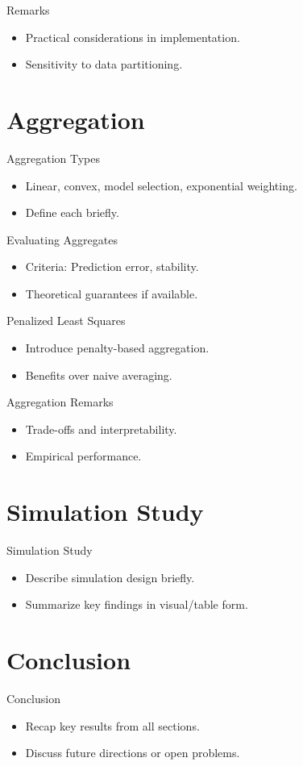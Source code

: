 \documentclass{beamer}
\newcommand{\0}{\emptyset}
\newcommand{\1}{\mathmybb{1}}
\begin{document}
\begin{frame}{Remarks}
  \begin{itemize}
    \item Practical considerations in implementation.
    \item Sensitivity to data partitioning.
  \end{itemize}
\end{frame}

\section{Aggregation}
\begin{frame}{Aggregation Types}
  \begin{itemize}
    \item Linear, convex, model selection, exponential weighting.
    \item Define each briefly.
  \end{itemize}
\end{frame}

\begin{frame}{Evaluating Aggregates}
  \begin{itemize}
    \item Criteria: Prediction error, stability.
    \item Theoretical guarantees if available.
  \end{itemize}
\end{frame}

\begin{frame}{Penalized Least Squares}
  \begin{itemize}
    \item Introduce penalty-based aggregation.
    \item Benefits over naive averaging.
  \end{itemize}
\end{frame}

\begin{frame}{Aggregation Remarks}
  \begin{itemize}
    \item Trade-offs and interpretability.
    \item Empirical performance.
  \end{itemize}
\end{frame}

\section{Simulation Study}
\begin{frame}{Simulation Study}
  \begin{itemize}
    \item Describe simulation design briefly.
    \item Summarize key findings in visual/table form.
  \end{itemize}
\end{frame}

\section{Conclusion}
\begin{frame}{Conclusion}
  \begin{itemize}
    \item Recap key results from all sections.
    \item Discuss future directions or open problems.
  \end{itemize}
\end{frame}
\end{document}
